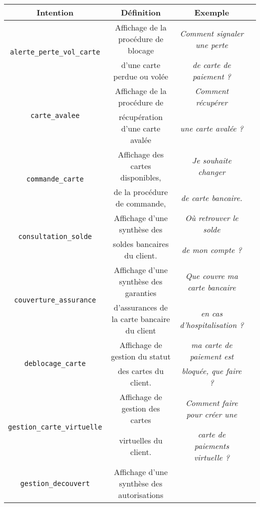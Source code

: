 		\begin{table}[!htb]
			\begin{center}
			\begin{scriptsize}
			\begin{tabular}{|c|c|c|c|}
			
				\hline
				\rowcolor{colorTableHeader!15}
				\textbf{Intention}
					& \textbf{Définition}
					& \textbf{Exemple}
					\tabularnewline
					\hline \hline
				\multirow{2}{*}{\texttt{alerte\_perte\_vol\_carte}}
					& Affichage de la procédure de blocage
					& \textit{Comment signaler une perte}
					\tabularnewline
					& d'une carte perdue ou volée
					& \textit{de carte de paiement ?}
					\tabularnewline
					\hline
				\multirow{2}{*}{\texttt{carte\_avalee}}
					& Affichage de la procédure de
					& \textit{Comment récupérer}
					\tabularnewline
					& récupération d'une carte avalée
					& \textit{une carte avalée ?}
					\tabularnewline
					\hline
				\multirow{2}{*}{\texttt{commande\_carte}}
					& Affichage des cartes disponibles,
					& \textit{Je souhaite changer}
					\tabularnewline
					& de la procédure de commande,
					& \textit{de carte bancaire.}
					\tabularnewline
					\hline
				\multirow{2}{*}{\texttt{consultation\_solde}}
					& Affichage d'une synthèse des
					& \textit{Où retrouver le solde}
					\tabularnewline
					& soldes bancaires du client.
					& \textit{ de mon compte ?}
					\tabularnewline
					\hline
				\multirow{2}{*}{\texttt{couverture\_assurance}}
					& Affichage d'une synthèse des garanties
					& \textit{Que couvre ma carte bancaire}
					\tabularnewline
					& d'assurances de la carte bancaire du client
					& \textit{en cas d'hospitalisation ?}
					\tabularnewline
					\hline
				\multirow{2}{*}{\texttt{deblocage\_carte}}
					& Affichage de gestion du statut
					& \textit{ma carte de paiement est}
					\tabularnewline
					& des cartes du client.
					& \textit{bloquée, que faire ?}
					\tabularnewline
					\hline
				\multirow{2}{*}{\texttt{gestion\_carte\_virtuelle}}
					& Affichage de gestion des cartes
					& \textit{Comment faire pour créer une}
					\tabularnewline
					& virtuelles du client.
					& \textit{carte de paiements virtuelle ?}
					\tabularnewline
					\hline
				\multirow{2}{*}{\texttt{gestion\_decouvert}}
					& Affichage d'une synthèse des autorisations

\end{tabular}
\end{scriptsize}
\end{center}
\end{table}
